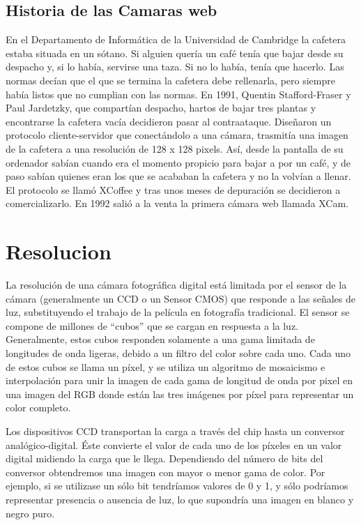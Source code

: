 \documentclass[12pt,a4paper]{report}
\begin{document}
\subsection{Historia de las Camaras web}

En el Departamento de Informática de la Universidad de Cambridge la cafetera estaba situada en un sótano. Si alguien quería un café tenía que bajar desde su despacho y, si lo había, servirse una taza. Si no lo había, tenía que hacerlo. Las normas decían que el que se termina la cafetera debe rellenarla, pero siempre había listos que no cumplian con las normas.
En 1991, Quentin Stafford-Fraser y Paul Jardetzky, que compartían despacho, hartos de bajar tres plantas y encontrarse la cafetera vacía decidieron pasar al contraataque. Diseñaron un protocolo cliente-servidor que conectándolo a una cámara, trasmitía una imagen de la cafetera a una resolución de 128 x 128 pixels.
Así, desde la pantalla de su ordenador sabían cuando era el momento propicio para bajar a por un café, y de paso sabían quienes eran los que se acababan la cafetera y no la volvían a llenar. El protocolo se llamó XCoffee y tras unos meses de depuración se decidieron a comercializarlo. En 1992 salió a la venta la primera cámara web llamada XCam.

\section{Resolucion}

La resolución de una cámara fotográfica digital está limitada por el sensor de la cámara (generalmente un CCD o un Sensor CMOS) que responde a las señales de luz, substituyendo el trabajo de la película en fotografía tradicional. El sensor se compone de millones de “cubos” que se cargan en respuesta a la luz. Generalmente, estos cubos responden solamente a una gama limitada de longitudes de onda ligeras, debido a un filtro del color sobre cada uno. Cada uno de estos cubos se llama un píxel, y se utiliza un algoritmo de mosaicismo e interpolación para unir la imagen de cada gama de longitud de onda por pixel en una imagen del RGB donde están las tres imágenes por píxel para representar un color completo.

Los dispositivos CCD transportan la carga a través del chip hasta un conversor analógico-digital. Éste convierte el valor de cada uno de los píxeles en un valor digital midiendo la carga que le llega. Dependiendo del número de bits del conversor obtendremos una imagen con mayor o menor gama de color. Por ejemplo, si se utilizase un sólo bit tendríamos valores de 0 y 1, y sólo podríamos representar presencia o ausencia de luz, lo que supondría una imagen en blanco y negro puro.
\end{document}
